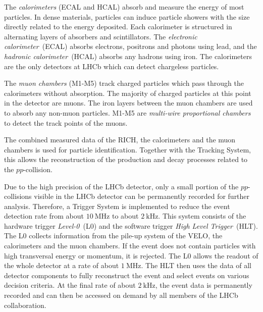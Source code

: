 The \emph{calorimeters} (ECAL and HCAL) absorb and measure the energy of most particles.
In dense materials, particles can induce particle showers with the size directly related to the energy deposited.
Each calorimeter is structured in alternating layers of absorbers and scintillators. 
The \emph{electronic calorimeter}~(ECAL) absorbs electrons, positrons and photons using lead, and the \emph{hadronic calorimeter}~(HCAL) absorbs any hadrons using iron.
The calorimeters are the only detectors at LHCb which can detect chargeless particles.

The \emph{muon chambers} (M1-M5) track charged particles which pass through the calorimeters without absorption.
The majority of charged particles at this point in the detector are muons.
The iron layers between the muon chambers are used to absorb any non-muon particles.
M1-M5 are \emph{multi-wire proportional chambers} to detect the track points of the muons.

The combined measured data of the RICH, the calorimeters and the muon chambers is used for particle identification.
Together with the Tracking System, this allows the reconstruction of the production and decay processes related to the $pp$-collision.

Due to the high precision of the LHCb detector, only a small portion of the $pp$-collisions visible in the LHCb detector can be permanently recorded for further analysis.
Therefore, a Trigger System is implemented to reduce the event detection rate from about $\qty{10}{\MHz}$ to about $\qty{2}{\kHz}$.
This system consists of the hardware trigger \emph{Level-0}~(L0) and the software trigger \emph{High Level Trigger}~(HLT).
The L0 collects information from the pile-up system of the VELO, the calorimeters and the muon chambers.
If the event does not contain particles with high transversal energy or momentum, it is rejected.
The L0 allows the readout of the whole detector at a rate of about $\qty{1}{\MHz}$.
The HLT then uses the data of all detector components to fully reconstruct the event and select events on various decision criteria.
At the final rate of about $\qty{2}{\kHz}$, the event data is permanently recorded and can then be accessed on demand by all members of the LHCb collaboration.

